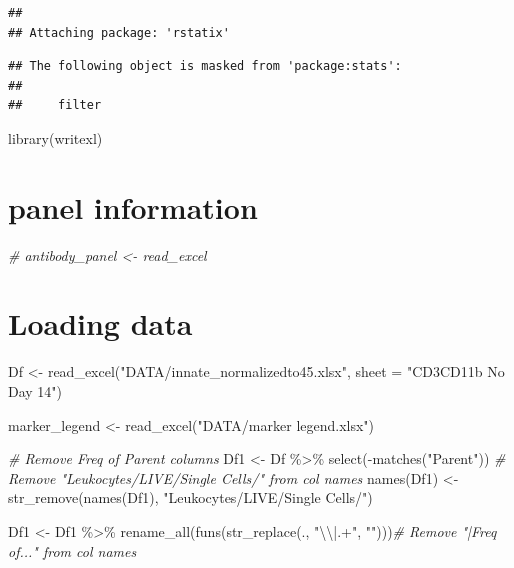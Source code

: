 \documentclass[
]{book}
\newenvironment{Shaded}{\begin{snugshade}}{\end{snugshade}}
\newcommand{\AttributeTok}[1]{\textcolor[rgb]{0.77,0.63,0.00}{#1}}
\newcommand{\CommentTok}[1]{\textcolor[rgb]{0.56,0.35,0.01}{\textit{#1}}}
\newcommand{\FunctionTok}[1]{\textcolor[rgb]{0.00,0.00,0.00}{#1}}
\newcommand{\NormalTok}[1]{#1}
\newcommand{\OtherTok}[1]{\textcolor[rgb]{0.56,0.35,0.01}{#1}}
\newcommand{\SpecialCharTok}[1]{\textcolor[rgb]{0.00,0.00,0.00}{#1}}
\newcommand{\StringTok}[1]{\textcolor[rgb]{0.31,0.60,0.02}{#1}}
\begin{document}
\begin{verbatim}
## 
## Attaching package: 'rstatix'
\end{verbatim}

\begin{verbatim}
## The following object is masked from 'package:stats':
## 
##     filter
\end{verbatim}

\begin{Shaded}
\begin{Highlighting}[]
\FunctionTok{library}\NormalTok{(writexl)}
\end{Highlighting}
\end{Shaded}

\hypertarget{panel-information}{%
\section{panel information}\label{panel-information}}

\begin{Shaded}
\begin{Highlighting}[]
\CommentTok{\# antibody\_panel \textless{}{-} read\_excel}
\end{Highlighting}
\end{Shaded}

\hypertarget{loading-data}{%
\section{Loading data}\label{loading-data}}

\begin{Shaded}
\begin{Highlighting}[]
\NormalTok{Df }\OtherTok{\textless{}{-}} \FunctionTok{read\_excel}\NormalTok{(}\StringTok{"DATA/innate\_normalizedto45.xlsx"}\NormalTok{, }\AttributeTok{sheet =} \StringTok{"CD3CD11b No Day 14"}\NormalTok{)}

\NormalTok{marker\_legend }\OtherTok{\textless{}{-}} \FunctionTok{read\_excel}\NormalTok{(}\StringTok{"DATA/marker legend.xlsx"}\NormalTok{)}

\CommentTok{\# Remove Freq of Parent columns}
\NormalTok{Df1 }\OtherTok{\textless{}{-}}\NormalTok{ Df }\SpecialCharTok{\%\textgreater{}\%} 
  \FunctionTok{select}\NormalTok{(}\SpecialCharTok{{-}}\FunctionTok{matches}\NormalTok{(}\StringTok{"Parent"}\NormalTok{))}
\CommentTok{\# Remove "Leukocytes/LIVE/Single Cells/" from col names}
\FunctionTok{names}\NormalTok{(Df1) }\OtherTok{\textless{}{-}} \FunctionTok{str\_remove}\NormalTok{(}\FunctionTok{names}\NormalTok{(Df1), }\StringTok{"Leukocytes/LIVE/Single Cells/"}\NormalTok{)}

\NormalTok{Df1 }\OtherTok{\textless{}{-}}\NormalTok{ Df1 }\SpecialCharTok{\%\textgreater{}\%}
  \FunctionTok{rename\_all}\NormalTok{(}\FunctionTok{funs}\NormalTok{(}\FunctionTok{str\_replace}\NormalTok{(., }\StringTok{"}\SpecialCharTok{\textbackslash{}\textbackslash{}}\StringTok{|.+"}\NormalTok{, }\StringTok{""}\NormalTok{)))}\CommentTok{\# Remove "|Freq of..." from col names}
\end{Highlighting}
\end{Shaded}
\end{document}
